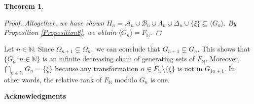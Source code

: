 \documentclass[11pt]{article}
\theoremstyle{plain}
\newtheorem{theorem}{Theorem}[section]
\theoremstyle{definition}
\begin{document}
\begin{theorem}
\begin{proof}
Altogether, we have shown $H_{n}=\mathcal{A}_{n}\cup\mathcal{B}_{n}\cup\Lambda_{n}\cup\Delta_{n}\cup\{\xi\}\subseteq \langle G_{n}\rangle.$ By Proposition \ref{Proposition8}, we obtain $\langle G_{n}\rangle=F_{\mathbb{N}}.$
\end{proof}
\end{theorem}

Let $n\in\mathbb{N}.$ Since $\Omega_{n+1}\subsetneq\Omega_{n},$ we can conclude that $G_{n+1}\subsetneq G_{n}.$ This shows that $\{G_{n}:n\in\mathbb{N}\}$ is an infinite decreasing chain of generating sets of $F_{\mathbb{N}}.$ Moreover, $\bigcap_{n\in\mathbb{N}} G_{n}=\{\xi\}$ because any transformation $\alpha\in F_{\mathbb{N}}\setminus\{\xi\}$ is not in $G_{1\alpha+1}.$ In other words, the relative rank of $F_{\mathbb{N}}$ modulo $G_{n}$ is one.

\vskip1cm \centerline{ \textbf{Acknowledgments}}
\end{document}
